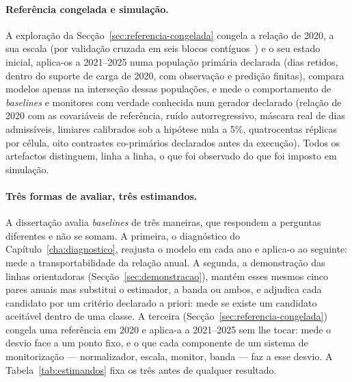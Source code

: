 \paragraph{Referência congelada e simulação.} A exploração da
Secção~\ref{sec:referencia-congelada} congela a relação de 2020, a sua
escala (por validação cruzada em seis blocos contíguos~\cite{BergmeirHyndmanKoo2018})
e o seu estado
inicial, aplica-os a 2021--2025 numa população primária declarada (dias
retidos, dentro do suporte de carga de 2020, com observação e predição
finitas), compara modelos apenas na interseção dessas populações, e mede o
comportamento de \emph{baselines} e monitores com verdade conhecida num
gerador declarado (relação de 2020 com as covariáveis de referência, ruído
autorregressivo, máscara real de dias admissíveis, limiares calibrados sob
a hipótese nula a 5\%, quatrocentas réplicas por célula, oito contrastes
co-primários declarados antes da execução). Todos os artefactos
distinguem, linha a linha, o que foi observado  do que foi imposto em simulação.

\paragraph{Três formas de avaliar, três estimandos.} A dissertação avalia
\emph{baselines} de três maneiras, que respondem a perguntas diferentes e
não se somam. A primeira, o diagnóstico do Capítulo~\ref{cha:diagnostico},
reajusta o modelo em cada ano e aplica-o ao seguinte: mede a
transportabilidade da relação anual. A segunda, a demonstração das linhas
orientadoras (Secção~\ref{sec:demonstracao}), mantém esses mesmos cinco
pares anuais mas substitui o estimador, a banda ou ambos, e adjudica cada
candidato por um critério declarado a priori: mede se existe um candidato
aceitável dentro de uma classe. A terceira
(Secção~\ref{sec:referencia-congelada}) congela uma referência em 2020 e
aplica-a a 2021--2025 sem lhe tocar: mede o desvio face a um ponto fixo, e o
que cada componente de um sistema de monitorização --- normalizador, escala,
monitor, banda --- faz a esse desvio. A Tabela~\ref{tab:estimandos} fixa os
três antes de qualquer resultado.

